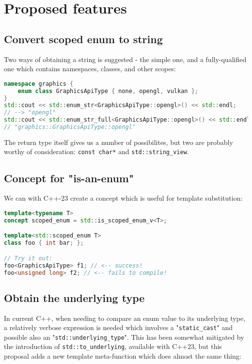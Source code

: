 \documentclass[
  format=manuscript,
  screen=true,
  review=false,
  nonacm=true,
  timestamp=true,
  balance=false]{acmart}
\begin{document}
\section{Proposed features}

\subsection{Convert scoped enum to string}

Two ways of obtaining a string is suggested - the simple one, and a fully-qualified
one which contains namespaces, classes, and other scopes:\vspace{2mm}

\begin{lstlisting}[language=Cpp]
namespace graphics {
    enum class GraphicsApiType { none, opengl, vulkan };
}
std::cout << std::enum_str<GraphicsApiType::opengl>() << std::endl;
// --> "opengl"
std::cout << std::enum_str_full<GraphicsApiType::opengl>() << std::endl;
// "graphics::GraphicsApiType::opengl"
\end{lstlisting}

\noindent
The return type itself gives us a number of possibilites, but two are probably worthy
of consideration: \texttt{const char*} and \texttt{std::string\_view}.


\subsection{Concept for "is-an-enum"}

We can with C++-23 create a concept which is useful for template substitution:\vspace{2mm}

\begin{lstlisting}[language=Cpp]
template<typename T>
concept scoped_enum = std::is_scoped_enum_v<T>;

template<std::scoped_enum T>
class foo { int bar; };

// Try it out:
foo<GraphicsApiType> f1; // <-- success!
foo<unsigned long> f2; // <-- fails to compile!
\end{lstlisting}


\subsection{Obtain the underlying type}

In current C++, when needing to compare an enum value to its underlying type,
a relatively verbose expression is needed which involves a "\texttt{static\_cast}"
and possible also an "\texttt{std::underlying\_type}". This has been somewhat
mitigated by the introduction of \texttt{std::to\_underlying}, available with C++23,
but this proposal adds a new template meta-function which does almost the same
thing:\vspace{2mm}
\end{document}

